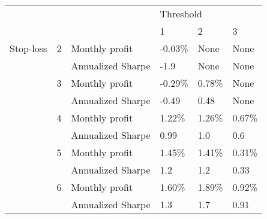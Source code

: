 \begin{tabular}{llllll}
\toprule
          &   &                   & \multicolumn{3}{l}{Threshold} \\
          &   &                   &         1 &       2 &       3 \\
\midrule
Stop-loss & 2 & Monthly profit &   -0.03\% &    None &    None \\
          &   & Annualized Sharpe &      -1.9 &    None &    None \\
          & 3 & Monthly profit &   -0.29\% &  0.78\% &    None \\
          &   & Annualized Sharpe &     -0.49 &    0.48 &    None \\
          & 4 & Monthly profit &    1.22\% &  1.26\% &  0.67\% \\
          &   & Annualized Sharpe &      0.99 &     1.0 &     0.6 \\
          & 5 & Monthly profit &    1.45\% &  1.41\% &  0.31\% \\
          &   & Annualized Sharpe &       1.2 &     1.2 &    0.33 \\
          & 6 & Monthly profit &    1.60\% &  1.89\% &  0.92\% \\
          &   & Annualized Sharpe &       1.3 &     1.7 &    0.91 \\
\bottomrule
\end{tabular}
